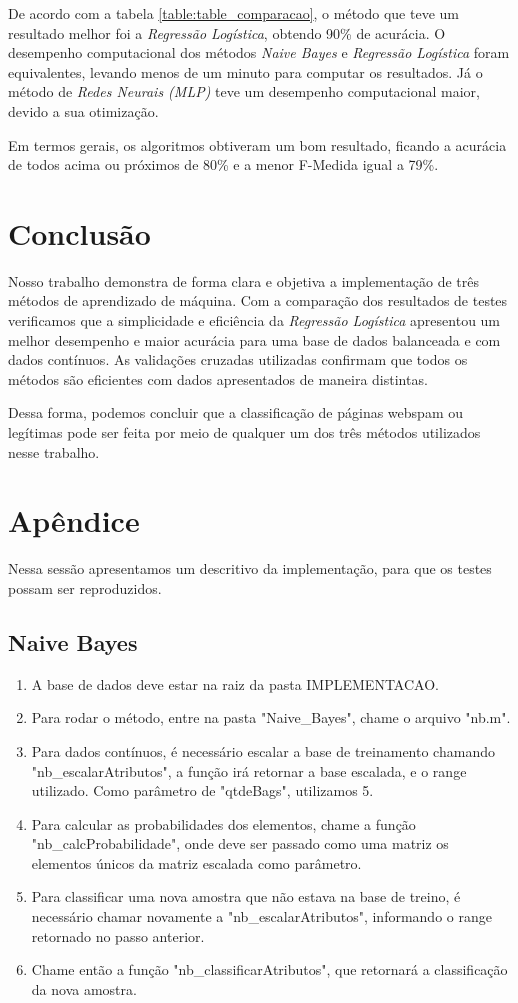 \documentclass[10pt, conference, compsocconf]{IEEEtran}
\begin{document}
De acordo com a tabela \ref{table:table_comparacao}, o método que teve um resultado melhor foi a \textit{Regressão Logística}, obtendo 90\% de acurácia. O desempenho computacional dos métodos \textit{Naive Bayes} e \textit{Regressão Logística} foram equivalentes, levando menos de um minuto para computar os resultados. Já o método de \textit{Redes Neurais (MLP)} teve um desempenho computacional maior, devido a sua otimização.

Em termos gerais, os algoritmos obtiveram um bom resultado, ficando a acurácia de todos acima ou próximos de 80\% e a menor F-Medida igual a 79\%.


\section{Conclusão}\label{conclusao}
Nosso trabalho demonstra de forma clara e objetiva a implementação de três métodos de aprendizado de máquina. Com a comparação dos resultados de testes verificamos que a simplicidade e eficiência da \textit{Regressão Logística} apresentou um melhor desempenho e maior acurácia para uma base de dados balanceada e com dados contínuos. As validações cruzadas utilizadas confirmam que todos os métodos são eficientes com dados apresentados de maneira distintas.

Dessa forma, podemos concluir que a classificação de páginas webspam ou legítimas pode ser feita por meio de qualquer um dos três métodos utilizados nesse trabalho.





\newpage
\section{Apêndice}
Nessa sessão apresentamos um descritivo da implementação, para que os testes possam ser reproduzidos.

\subsection{Naive Bayes}
\begin{enumerate}
\item A base de dados deve estar na raiz da pasta IMPLEMENTACAO.
\item Para rodar o método, entre na pasta "Naive\_Bayes", chame o arquivo "nb.m".
\item Para dados contínuos, é necessário escalar a base de treinamento chamando "nb\_escalarAtributos", a função irá retornar a base escalada, e o range utilizado. Como parâmetro de "qtdeBags", utilizamos 5.
\item Para calcular as probabilidades dos elementos, chame a função "nb\_calcProbabilidade", onde deve ser passado como uma matriz os elementos únicos da matriz escalada como parâmetro.
\item Para classificar uma nova amostra que não estava na base de treino, é necessário chamar novamente a "nb\_escalarAtributos", informando o range retornado no passo anterior.
\item Chame então a função "nb\_classificarAtributos", que retornará a classificação da nova amostra.
\end{enumerate}
\end{document}
